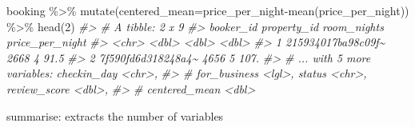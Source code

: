 \documentclass[
]{article}
\newenvironment{Shaded}{\begin{snugshade}}{\end{snugshade}}
\newcommand{\AttributeTok}[1]{\textcolor[rgb]{0.77,0.63,0.00}{#1}}
\newcommand{\CommentTok}[1]{\textcolor[rgb]{0.56,0.35,0.01}{\textit{#1}}}
\newcommand{\DecValTok}[1]{\textcolor[rgb]{0.00,0.00,0.81}{#1}}
\newcommand{\FunctionTok}[1]{\textcolor[rgb]{0.00,0.00,0.00}{#1}}
\newcommand{\NormalTok}[1]{#1}
\newcommand{\SpecialCharTok}[1]{\textcolor[rgb]{0.00,0.00,0.00}{#1}}
\begin{document}
\begin{Shaded}
\begin{Highlighting}[]
\NormalTok{booking }\SpecialCharTok{\%\textgreater{}\%} 
  \FunctionTok{mutate}\NormalTok{(}\AttributeTok{centered\_mean=}\NormalTok{price\_per\_night}\SpecialCharTok{{-}}\FunctionTok{mean}\NormalTok{(price\_per\_night)) }\SpecialCharTok{\%\textgreater{}\%} 
  \FunctionTok{head}\NormalTok{(}\DecValTok{2}\NormalTok{)}
\CommentTok{\#\textgreater{} \# A tibble: 2 x 9}
\CommentTok{\#\textgreater{}   booker\_id          property\_id room\_nights price\_per\_night}
\CommentTok{\#\textgreater{}   \textless{}chr\textgreater{}                    \textless{}dbl\textgreater{}       \textless{}dbl\textgreater{}           \textless{}dbl\textgreater{}}
\CommentTok{\#\textgreater{} 1 215934017ba98c09f\textasciitilde{}        2668           4            91.5}
\CommentTok{\#\textgreater{} 2 7f590fd6d318248a4\textasciitilde{}        4656           5           107. }
\CommentTok{\#\textgreater{} \# ... with 5 more variables: checkin\_day \textless{}chr\textgreater{},}
\CommentTok{\#\textgreater{} \#   for\_business \textless{}lgl\textgreater{}, status \textless{}chr\textgreater{}, review\_score \textless{}dbl\textgreater{},}
\CommentTok{\#\textgreater{} \#   centered\_mean \textless{}dbl\textgreater{}}
\end{Highlighting}
\end{Shaded}

summarise: extracts the number of variables
\end{document}
